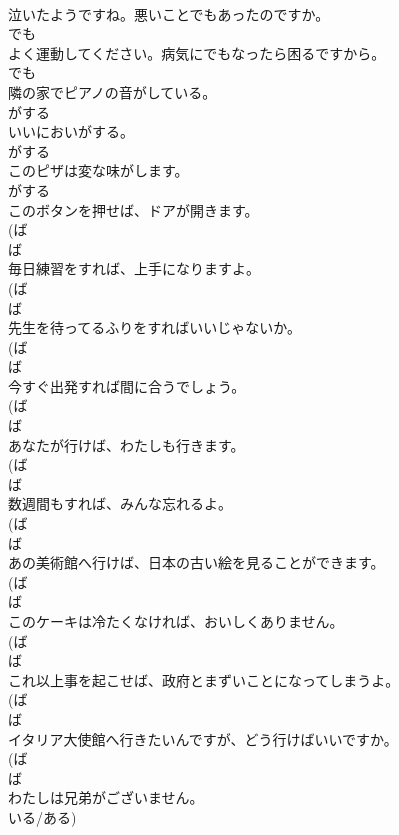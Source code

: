 \documentclass[8pt]{extreport}
\begin{document}
\begin{CJK}{UTF8}{min}
\\	泣いたようですね。悪いことでもあったのですか。	
\\	でも	
\\	よく運動してください。病気にでもなったら困るですから。	
\\	でも	
\\	隣の家でピアノの音がしている。	
\\	がする	
\\	いいにおいがする。	
\\	がする	
\\	このピザは変な味がします。	
\\	がする	
\\	このボタンを押せば、ドアが開きます。	
\\	(ば 
\\	ば	
\\	毎日練習をすれば、上手になりますよ。	
\\	(ば 
\\	ば	
\\	先生を待ってるふりをすればいいじゃないか。	
\\	(ば 
\\	ば	
\\	今すぐ出発すれば間に合うでしょう。	
\\	(ば 
\\	ば	
\\	あなたが行けば、わたしも行きます。	
\\	(ば 
\\	ば	
\\	数週間もすれば、みんな忘れるよ。	
\\	(ば 
\\	ば	
\\	あの美術館へ行けば、日本の古い絵を見ることができます。	
\\	(ば 
\\	ば	
\\	このケーキは冷たくなければ、おいしくありません。	
\\	(ば 
\\	ば	
\\	これ以上事を起こせば、政府とまずいことになってしまうよ。	
\\	(ば 
\\	ば	
\\	イタリア大使館へ行きたいんですが、どう行けばいいですか。	
\\	(ば 
\\	ば	
\\	わたしは兄弟がございません。	
\\	いる/ある)	

\end{CJK}
\end{document}
